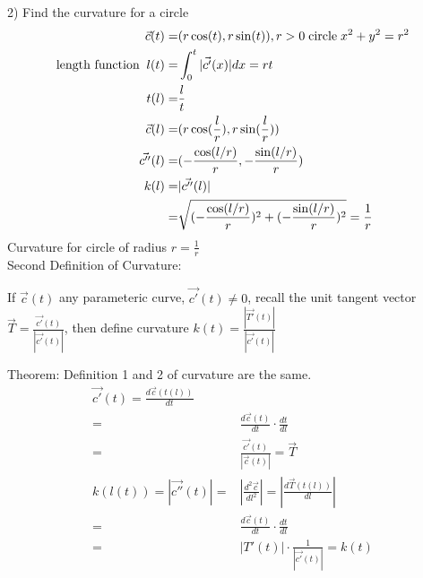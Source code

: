 \documentclass{article}
\begin{document}
        2) Find the curvature for a circle
        \begin{align}
            \vec{c}(t) =& (r\cos(t),r\sin(t)), r>0 \text{\;circle\;} x^2 + y^2 = r^2\\
            \text{length function\;\;}l(t) =& \int^{t}_{0} |\vec{c'}(x)|dx = rt\\
            t(l) =& \frac{l}{t}\\
            \vec{c}(l) =& (r\cos(\frac{l}{r}),r\sin(\frac{l}{r}))\\
            \vec{c''}(l) =& (-\frac{\cos(l/r)}{r},-\frac{\sin(l/r)}{r})\\
            k(l) =& |\vec{c''}(l)|\\
            =& \sqrt{(-\frac{\cos(l/r)}{r})^2+(-\frac{\sin(l/r)}{r})^2} = \frac{1}{r}
        \end{align}
        Curvature for circle of radius $r =\frac{1}{r}$\\
        
        Second Definition of Curvature:
        
        If $\vec{c}(t)$ any parameteric curve, $\vec{c'}(t)\neq0$, recall the unit tangent vector $\vec{T} = \frac{\vec{c'}(t)}{|\vec{c'}(t)|}$, then define curvature $k(t)=\frac{|\vec{T'}(t)|}{|\vec{c'}(t)|}$
        
        Theorem: Definition 1 and 2 of curvature are the same.
        \begin{align}
            \vec{c'}(t) = \frac{d\vec{c}(t(l))}{dt}\\
            =&\frac{d\vec{c}(t)}{dt}\cdot\frac{dt}{dl}\\
            =&\frac{\vec{c'}(t)}{|\vec{c}(t)|} = \vec{T}\\
            k(l(t)) = |\vec{c''}(t)| =& |\frac{d^2\vec{c}}{dl^2}| = |\frac{d\vec{T}(t(l))}{dl}|\\
            =&\frac{d\vec{c}(t)}{dt}\cdot\frac{dt}{dl}\\
            =&|T'(t)|\cdot\frac{1}{|\vec{c'}(t)|} = k(t)
        \end{align}
        
\end{document}
